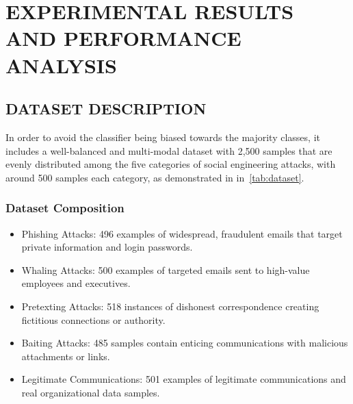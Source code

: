 
\chapter{EXPERIMENTAL RESULTS AND PERFORMANCE ANALYSIS}

\section{DATASET DESCRIPTION}
In order to avoid the classifier being biased towards the majority classes, it includes a well-balanced and multi-modal dataset with 2,500 samples that are evenly distributed among the five categories of social engineering attacks, with around 500 samples each category, as demonstrated in in~\ref{tab:dataset}.
\begin{table}[h!]
\centering
\caption{Dataset Description}
\label{tab:dataset}
\footnotesize
\renewcommand{\arraystretch}{1.05}
\setlength{\tabcolsep}{3pt}

\end{table}


%
\subsection{Dataset Composition} 
\begin{itemize}
    \item Phishing Attacks: 496 examples of widespread, fraudulent emails that target private information and login passwords.
    \item Whaling Attacks: 500 examples of targeted emails sent to high-value employees and executives.
    \item Pretexting Attacks: 518 instances of dishonest correspondence creating fictitious connections or authority.
    \item Baiting Attacks: 485 samples contain enticing communications with malicious attachments or links.
    \item Legitimate Communications: 501 examples of legitimate communications and real organizational data samples.
\end{itemize}
